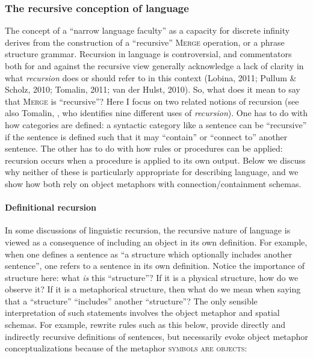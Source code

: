 \subsubsection{The recursive conception of language}

The concept of a “narrow language faculty” as a capacity for discrete infinity derives from the construction of a “recursive” \textsc{Merge} operation, or a phrase structure grammar. Recursion in language is controversial, and commentators both for and against the recursive view generally acknowledge a lack of clarity in what \textit{recursion} does or should refer to in this context (Lobina, 2011; Pullum \& Scholz, 2010; Tomalin, 2011; van der Hulst, 2010). So, what does it mean to say that \textsc{Merge} is “recursive”? Here I focus on two related notions of recursion (see also Tomalin, , who identifies nine different uses of \textit{recursion}). One has to do with how categories are defined: a syntactic category like a sentence can be “recursive” if the sentence is defined such that it may “contain” or “connect to” another sentence. The other has to do with how rules or procedures can be applied: recursion occurs when a procedure is applied to its own output. Below we discuss why neither of these is particularly appropriate for describing language, and we show how both rely on object metaphors with connection/containment schemas.

\paragraph{Definitional recursion}

In some discussions of linguistic recursion, the recursive nature of language is viewed as a consequence of including an object in its own definition. For example, when one defines a sentence as “a structure which optionally includes another sentence”, one refers to a sentence in its own definition. Notice the importance of structure here: what \textit{is} this “structure”? If it is a physical structure, how do we observe it? If it is a metaphorical structure, then what do we mean when saying that a “structure” “includes” another “structure”? The only sensible interpretation of such statements involves the object metaphor and spatial schemas. For example, rewrite rules such as this below, provide directly and indirectly recursive definitions of sentences, but necessarily evoke object metaphor conceptualizations because of the metaphor \textsc{symbols} \textsc{are} \textsc{objects}:


